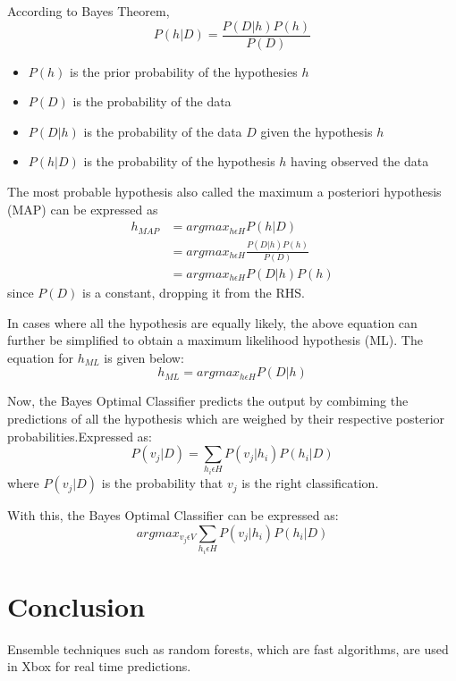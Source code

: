 \documentclass{acmtog} %
\begin{document}
According to Bayes Theorem,
\begin{equation}
	P(h|D) = \frac{P(D|h)P(h)}{P(D)}
	\label{eq:bayesEq}
\end{equation}
\begin{itemize}
	\item $P(h)$ is the prior probability of the hypothesies $h$
	\item $P(D)$ is the probability of the data
	\item $P(D|h)$ is the probability of the data $D$ given the hypothesis $h$
	\item $P(h|D)$ is the probability of the hypothesis $h$ having observed the data
\end{itemize}

The most probable hypothesis also called the maximum a posteriori hypothesis (MAP) can be expressed as
\begin{equation}
	\begin{split}
		h_{MAP} & = argmax_{h \epsilon H} P(h|D) \\
		& = argmax_{h \epsilon H} \frac{P(D|h)P(h)}{P(D)} \\
		& = argmax_{h \epsilon H} P(D|h)P(h)
		\label{eq:mapEq}
	\end{split}
\end{equation}
since $P(D)$ is a constant, dropping it from the RHS.

In cases where all the hypothesis are equally likely, the above equation can further be simplified to obtain a maximum likelihood hypothesis (ML). The equation for $h_{ML}$ is given below:
\begin{equation}
	h_{ML} = argmax_{h \epsilon H} P(D|h)
	\label{eq:mlEq}
\end{equation}

Now, the Bayes Optimal Classifier predicts the output by combiming the predictions of all the hypothesis which are weighed by their respective posterior probabilities.Expressed as:
\begin{equation}
	P(v_j|D) = \sum _{h_i \epsilon H} P(v_j|h_i) P(h_i|D)
	\label{eq:bocEq1}
\end{equation}
where $P(v_j|D)$ is the probability that $v_j$ is the right classification.

With this, the Bayes Optimal Classifier can be expressed as:
\begin{equation}
	argmax_{v_j \epsilon V} \sum _{h_i \epsilon H} P(v_j|h_i) P(h_i|D)
	\label{eq:bocEq2}
\end{equation}
\section{Conclusion}
Ensemble techniques such as random forests, which are fast algorithms, are used in Xbox for real time predictions.



 
\end{document}
